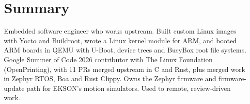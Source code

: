 \documentclass[10pt]{article}
\begin{document}

\section*{Summary}
Embedded software engineer who works upstream. Built custom Linux images with Yocto and Buildroot, wrote a Linux kernel module for ARM, and booted ARM boards in QEMU with U-Boot, device trees and BusyBox root file systems. Google Summer of Code 2026 contributor with The Linux Foundation (OpenPrinting), with 11 PRs merged upstream in C and Rust, plus merged work in Zephyr RTOS, Boa and Rust Clippy. Owns the Zephyr firmware and firmware-update path for EKSON's motion simulators. Used to remote, review-driven work.
\end{document}
